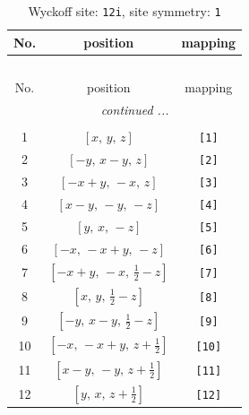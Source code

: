 \documentclass[fleqn,8pt]{jsarticle}
\begin{document}
\renewcommand{\arraystretch}{1.2}
\begin{longtable}{ccc}
\caption{Wyckoff site: {\tt 12i}, site symmetry: {\tt 1}}
 \\
 \hline \hline
No. & position & mapping \\ \hline \endfirsthead

\multicolumn{2}{l}{\tablename\ \thetable{}} \\
 \hline \hline
No. & position & mapping \\ \hline \endhead

 \hline \hline
\multicolumn{2}{r}{\footnotesize\it continued ...} \\ \endfoot

 \hline \hline
\multicolumn{2}{r}{} \\ \endlastfoot

1 & $\left[ x,\, y,\, z \right]$ & {\tt [1]} \\ \hline
2 & $\left[ - y,\, x - y,\, z \right]$ & {\tt [2]} \\ \hline
3 & $\left[ - x + y,\, - x,\, z \right]$ & {\tt [3]} \\ \hline
4 & $\left[ x - y,\, - y,\, - z \right]$ & {\tt [4]} \\ \hline
5 & $\left[ y,\, x,\, - z \right]$ & {\tt [5]} \\ \hline
6 & $\left[ - x,\, - x + y,\, - z \right]$ & {\tt [6]} \\ \hline
7 & $\left[ - x + y,\, - x,\, \frac{1}{2} - z \right]$ & {\tt [7]} \\ \hline
8 & $\left[ x,\, y,\, \frac{1}{2} - z \right]$ & {\tt [8]} \\ \hline
9 & $\left[ - y,\, x - y,\, \frac{1}{2} - z \right]$ & {\tt [9]} \\ \hline
10 & $\left[ - x,\, - x + y,\, z + \frac{1}{2} \right]$ & {\tt [10]} \\ \hline
11 & $\left[ x - y,\, - y,\, z + \frac{1}{2} \right]$ & {\tt [11]} \\ \hline
12 & $\left[ y,\, x,\, z + \frac{1}{2} \right]$ & {\tt [12]} \\
\end{longtable}
\end{document}
